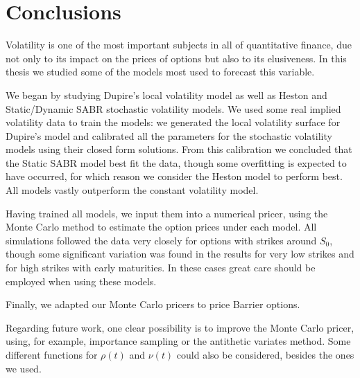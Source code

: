 
\section{Conclusions}
\label{sec:concl}
Volatility is one of the most important subjects in all of quantitative finance, due not only to its impact on the prices of options but also to its elusiveness. In this thesis we studied some of the models most used to forecast this variable.

We began by studying Dupire's local volatility model as well as Heston and Static/Dynamic SABR stochastic volatility models. We used some real implied volatility data to train the models: we generated the local volatility surface for Dupire's model and calibrated all the parameters for the stochastic volatility models using their closed form solutions.
From this calibration we concluded that the Static SABR model best fit the data, though some overfitting is expected to have occurred, for which reason we consider the Heston model to perform best. All models vastly outperform the constant volatility model.

Having trained all models, we input them into a numerical pricer, using the Monte Carlo method to estimate the option prices under each model. All simulations followed the data very closely for options with strikes around $S_0$, though some significant variation was found in the results for very low strikes and for high strikes with early maturities. In these cases great care should be employed when using these models.

Finally, we adapted our Monte Carlo pricers to price Barrier options.

Regarding future work, one clear possibility is to improve the Monte Carlo pricer, using, for example, importance sampling or the antithetic variates method. Some different functions for $\rho(t)$ and $\nu(t)$ could also be considered, besides the ones we used.